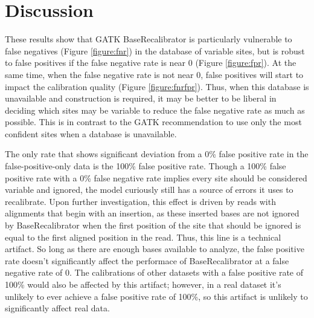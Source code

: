 
\section{Discussion}
\label{sec:kbbq_discussion}
These results show that GATK BaseRecalibrator is particularly vulnerable to false negatives (Figure \ref{figure:fnr}) in the database of variable sites, but is robust to false positives if the false negative rate is near 0 (Figure \ref{figure:fpr}). At the same time, when the false negative rate is not near 0, false positives will start to impact the calibration quality (Figure \ref{figure:fnrfpr}). Thus, when this database is unavailable and construction is required, it may be better to be liberal in deciding which sites may be variable to reduce the false negative rate as much as possible. This is in contrast to the GATK recommendation to use only the most confident sites when a database is unavailable.

The only rate that shows significant deviation from a 0\% false positive rate in the false-positive-only data is the 100\% false positive rate. Though a 100\% false positive rate with a 0\% false negative rate implies every site should be considered variable and ignored, the model curiously still has a source of errors it uses to recalibrate. Upon further investigation, this effect is driven by reads with alignments that begin with an insertion, as these inserted bases are not ignored by BaseRecalibrator when the first position of the site that should be ignored is equal to the first aligned position in the read. Thus, this line is a technical artifact. So long as there are enough bases available to analyze, the false positive rate doesn't significantly affect the performace of BaseRecalibrator at a false negative rate of 0. The calibrations of other datasets with a false positive rate of 100\% would also be affected by this artifact; however, in a real dataset it's unlikely to ever achieve a false positive rate of 100\%, so this artifact is unlikely to significantly affect real data.

